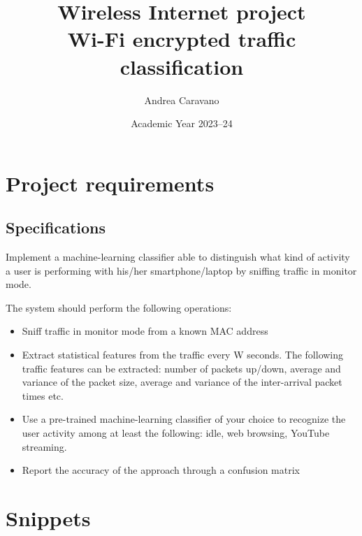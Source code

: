 \documentclass[a4paper,11pt]{article} %
\begin{document}
    \pagestyle{fancy}
    \fancyhead{}\fancyfoot{}
    \fancyfoot[C]{\thepage}

    \title{\textbf{Wireless Internet project}\\Wi-Fi encrypted traffic classification}
    \author{Andrea Caravano}
    \date{Academic Year 2023--24}
    \maketitle


    \section{Project requirements}\label{sec:project-requirements}

    \subsection{Specifications}\label{subsec:specifications}

    Implement a machine-learning classifier able to distinguish what kind of activity a user is performing with his/her smartphone/laptop by sniffing traffic in monitor mode.

    The system should perform the following operations:

    \begin{itemize}
        \item Sniff traffic in monitor mode from a known MAC address
        \item Extract statistical features from the traffic every W seconds.
        The following traffic features can be extracted: number of packets up/down, average and variance of the packet size, average and variance of the inter-arrival packet times etc.
        \item Use a pre-trained machine-learning classifier of your choice to recognize the user activity among at least the following: idle, web browsing, YouTube streaming.
        \item Report the accuracy of the approach through a confusion matrix
    \end{itemize}


    \section{Snippets}\label{sec:snippets}
\end{document}
